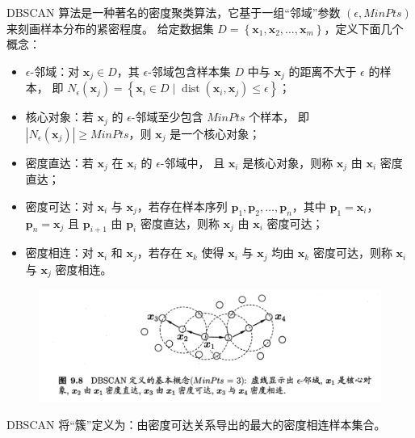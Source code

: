 DBSCAN 算法是一种著名的密度聚类算法，它基于一组“邻域”参数 $(\epsilon, MinPts)$ 来刻画样本分布的紧密程度。
给定数据集 $D = \left\{\boldsymbol{x}_1, \boldsymbol{x}_2, \dots, \boldsymbol{x}_m\right\}$，定义下面几个概念：
\begin{itemize}
    \item $\epsilon$-邻域：对 $\boldsymbol{x}_j \in D$，其 $\epsilon$-邻域包含样本集 $D$ 中与 $\boldsymbol{x}_j$ 的距离不大于 $\epsilon$ 的样本，
    即 $N_{\epsilon}\left(\boldsymbol{x}_{j}\right)=\left\{\boldsymbol{x}_{i} \in D \mid \operatorname{dist}\left(\boldsymbol{x}_{i}, \boldsymbol{x}_{j}\right) \leqslant \epsilon\right\}$；
    \item 核心对象：若 $\boldsymbol{x}_j$ 的 $\epsilon$-邻域至少包含 $MinPts$ 个样本，
    即 $\left|N_\epsilon(\boldsymbol{x}_j)\right| \geq MinPts$，则 $\boldsymbol{x}_j$ 是一个核心对象；
    \item 密度直达：若 $\boldsymbol{x}_j$ 在 $\boldsymbol{x}_i$ 的 $\epsilon$-邻域中，
    且 $\boldsymbol{x}_i$ 是核心对象，则称 $\boldsymbol{x}_j$ 由 $\boldsymbol{x}_i$ 密度直达；
    \item 密度可达：对 $\boldsymbol{x}_i$ 与 $\boldsymbol{x}_j$，若存在样本序列 $\boldsymbol{p}_1, \boldsymbol{p}_2, \dots, \boldsymbol{p}_n$，其中 $\boldsymbol{p}_1 = \boldsymbol{x}_i$，$\boldsymbol{p}_n = \boldsymbol{x}_j$ 
    且 $\boldsymbol{p}_{i+1}$ 由 $\boldsymbol{p}_i$ 密度直达，则称 $\boldsymbol{x}_j$ 由 $\boldsymbol{x}_i$ 密度可达；
    \item 密度相连：对 $\boldsymbol{x}_i$ 和 $\boldsymbol{x}_j$，若存在 $\boldsymbol{x}_k$ 使得 $\boldsymbol{x}_i$ 
    与 $\boldsymbol{x}_j$ 均由 $\boldsymbol{x}_k$ 密度可达，则称 $\boldsymbol{x}_i$ 与 $\boldsymbol{x}_j$ 密度相连。
\end{itemize}

\begin{figure}[htbp]
    \centering\includegraphics[scale = 0.5]{DBSCAN.png}
\end{figure}

DBSCAN 将“簇”定义为：由密度可达关系导出的最大的密度相连样本集合。

